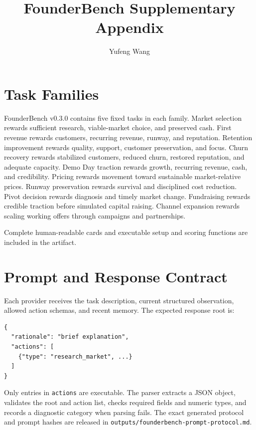 \documentclass[sigconf]{acmart}
\title{FounderBench Supplementary Appendix}
\author{Yufeng Wang}
\affiliation{%
  \institution{Independent Researcher}
  \country{United States}}
\begin{document}
\maketitle

\section{Task Families}
FounderBench v0.3.0 contains five fixed tasks in each family.
Market selection rewards sufficient research, viable-market choice, and preserved cash.
First revenue rewards customers, recurring revenue, runway, and reputation.
Retention improvement rewards quality, support, customer preservation, and focus.
Churn recovery rewards stabilized customers, reduced churn, restored reputation, and adequate capacity.
Demo Day traction rewards growth, recurring revenue, cash, and credibility.
Pricing rewards movement toward sustainable market-relative prices.
Runway preservation rewards survival and disciplined cost reduction.
Pivot decision rewards diagnosis and timely market change.
Fundraising rewards credible traction before simulated capital raising.
Channel expansion rewards scaling working offers through campaigns and partnerships.

Complete human-readable cards and executable setup and scoring functions are included in the artifact.

\section{Prompt and Response Contract}
Each provider receives the task description, current structured observation, allowed action schemas, and recent memory.
The expected response root is:
\begin{verbatim}
{
  "rationale": "brief explanation",
  "actions": [
    {"type": "research_market", ...}
  ]
}
\end{verbatim}
Only entries in \texttt{actions} are executable.
The parser extracts a JSON object, validates the root and action list, checks required fields and numeric types, and records a diagnostic category when parsing fails.
The exact generated protocol and prompt hashes are released in
\texttt{outputs/founderbench-prompt-protocol.md}.
\end{document}
